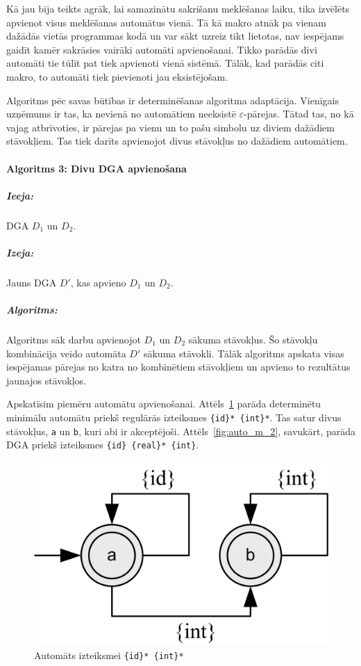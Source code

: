 Kā jau bija teikts agrāk, lai samazinātu sakrišanu meklēšanas laiku, tika izvēlēts apvienot visus meklēšanas automātus vienā. Tā kā makro atnāk pa vienam dažādās vietās programmas kodā un var sākt uzreiz tikt lietotas, nav iespējams gaidīt kamēr sakrāsies vairāki automāti apvienošanai. Tikko parādās divi automāti tie tūlīt pat tiek apvienoti vienā sistēmā. Tālāk, kad parādās citi makro, to automāti tiek pievienoti jau eksistējošam.

Algoritms pēc savas būtības ir determinēšanas algoritma adaptācija. Vienīgais uzņēmums ir tas, ka nevienā no automātiem neeksistē $\varepsilon$-pārejas. Tātad tas, no kā vajag atbrīvoties, ir pārejas pa vienu un to pašu simbolu uz diviem dažādiem stāvokļiem. Tas tiek darīts apvienojot divus stāvokļus no dažādiem automātiem. 

\paragraph*{Algoritms 3: Divu DGA apvienošana}
\subparagraph{Ieeja:}DGA $D_1$ un $D_2$.
\subparagraph{Izeja:}Jauns DGA $D'$, kas apvieno $D_1$ un $D_2$.
\subparagraph{Algoritms:} 

Algoritms sāk darbu apvienojot $D_1$ un $D_2$ sākuma stāvokļus. Šo stāvokļu kombinācija veido automāta $D'$ sākuma stāvokli. Tālāk algoritms apskata visas iespējamas pārejas no katra no kombinētiem stāvokļiem un apvieno to rezultātus jaunajos stāvokļos. 

Apskatīsim piemēru automātu apvienošanai. Attēls~\ref{fig:auto_m_1} parāda determinētu minimālu automātu priekš regulārās izteiksmes \verb|{id}* {int}*|. Tas satur divus stāvokļus, \verb|a| un \verb|b|, kuri abi ir akceptējoši. Attēls~\ref{fig:auto_m_2}, savukārt, parāda DGA priekš izteiksmes \verb|{id} {real}* {int}|.

\begin{figure}[H]
  \centering
    \includegraphics[scale=1.5]{pictures/auto_m_1}
  \caption{\label{fig:auto_m_1}Automāts izteiksmei \texttt{\{id\}* \{int\}*}}
\end{figure}

